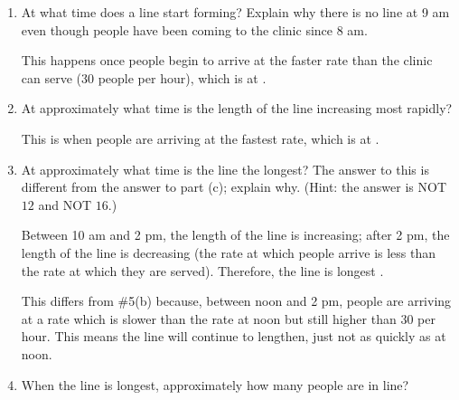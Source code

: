 \documentclass{article}
\begin{document}
\begin{enumerate}
{\begin{enumerate}
    \item 
      \begin{problem}[\vfill]
        At what time does a line start forming? Explain why there is no
        line at 9 am even though people have been coming to the clinic
        since 8 am.
      \end{problem}

      \begin{solution} %
        This happens once people begin to arrive at the faster rate than
        the clinic can serve (30 people per hour), which is at .
      \end{solution}

    \item
\begin{problem}[\vfill]
        At approximately what time is the length of the line increasing most
        rapidly?
      \end{problem}

      \begin{solution} %
        This is when people are arriving at the fastest rate, which is
        at .
      \end{solution}

    \item
\begin{problem}[\nstretch{2}]
        At approximately what time is the line the longest? The answer to
        this is different from the answer to part (c); explain
        why. (Hint: the answer is NOT $12$ and NOT $16$.)
      \end{problem}

      \begin{solution} %
        Between 10 am and 2 pm, the length of the line is increasing; after
        2 pm, the length of the line is decreasing (the rate at which people
        arrive is less than the rate at which they are served).  Therefore,
        the line is longest .

        This differs from {{{{\#5}}(b)}} because, between noon and 2
        pm, people are arriving at a rate which is slower than the rate at
        noon but still higher than 30 per hour. This means the line will
        continue to lengthen, just not as quickly as at noon.
      \end{solution}

    \item
\begin{problem}[\vfill]
        When the line is longest, approximately how many people are in line?
      \end{problem}


\end{enumerate}}
\end{enumerate}
\end{document}
